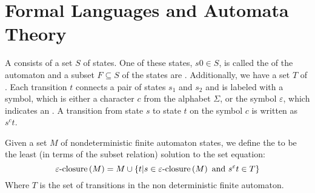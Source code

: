 \chapter{Formal Languages and Automata Theory}

\begin{defi}
A  consists of a set $S$ of states. One of these states, $s0\in S$, is called the  of the automaton and a subset $F\subseteq S$ of the states are . Additionally, we have a set $T$ of . Each transition $t$ connects a pair of states $s_1$ and $s_2$ and is labeled with a symbol, which is either a character $c$ from the alphabet $\Sigma$, or the symbol $\varepsilon$, which indicates an . A transition from state $s$ to state $t$ on the symbol $c$ is written as $s^ct$.\cite{mogensen2009basics}
\end{defi}

\begin{defi}
Given a set $M$ of nondeterministic finite automaton states, we define the  to be the least (in terms of the subset relation) solution to the set equation:
\begin{equation}
\varepsilon\mbox{-closure}\left(M\right) = M\cup \left\{t|s\in \varepsilon\mbox{-closure}\left(M\right)\mbox{ and }s^\varepsilon t\in T \right\}
\end{equation}
Where $T$ is the set of transitions in the non deterministic finite automaton.\cite{mogensen2009basics}
\end{defi}